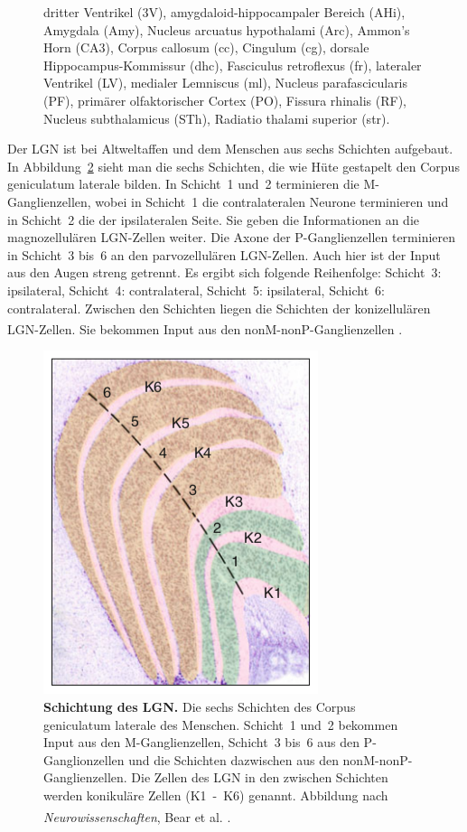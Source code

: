 \documentclass[12pt,a4paper,pdftex]{article}
\begin{document}
\begin{figure}[H]
{    dritter Ventrikel (3V), amygdaloid-hippocampaler Bereich (AHi), Amygdala (Amy), Nucleus arcuatus hypothalami (Arc), Ammon's Horn (CA3), Corpus callosum (cc), Cingulum (cg), dorsale Hippocampus-Kommissur (dhc), Fasciculus retroflexus (fr), lateraler Ventrikel (LV), medialer Lemniscus (ml), Nucleus parafascicularis (PF),  primärer  olfaktorischer  Cortex (PO), Fissura rhinalis (RF), Nucleus subthalamicus (STh), Radiatio thalami superior (str).}
    \label{fig:LGN}
\end{figure}

Der LGN ist bei Altweltaffen und dem Menschen aus sechs Schichten aufgebaut. 
In Abbildung~\ref{fig:schichtung-LGN} sieht man die sechs Schichten, die wie Hüte gestapelt den Corpus geniculatum laterale bilden. In Schicht~1 und~2 terminieren die M-Ganglienzellen, wobei in Schicht~1 die contralateralen Neurone terminieren und in Schicht~2 die der ipsilateralen Seite. Sie geben die Informationen an die magnozellulären LGN-Zellen weiter. Die Axone der P-Ganglienzellen terminieren in Schicht~3 bis~6 an den parvozellulären LGN-Zellen. Auch hier ist der Input aus den Augen streng getrennt. Es ergibt sich folgende Reihenfolge: Schicht~3: ipsilateral, Schicht~4: contralateral, Schicht~5: ipsilateral, Schicht~6: contralateral.
Zwischen den Schichten liegen die Schichten der konizellulären LGN-Zellen. Sie bekommen Input aus den nonM-nonP-Ganglienzellen \textsuperscript{\cite[9.7]{heldmaier2003tierphysiologie}}.

\begin{figure}[H]
    \centering
    \includegraphics{pictures/visual/LGN_baer.png}
    \caption[Schichtung des LGN]{\textbf{Schichtung des LGN.} Die sechs Schichten des Corpus geniculatum laterale des Menschen. Schicht~1 und~2 bekommen Input aus den M-Ganglienzellen, Schicht~3 bis~6 aus den P-Ganglionzellen und die Schichten dazwischen aus den nonM-nonP-Ganglienzellen. Die Zellen des LGN in den zwischen Schichten werden konikuläre Zellen (K1~-~K6) genannt. Abbildung nach \textit{Neurowissenschaften}, Bear et al. \textsuperscript{\cite[10]{neurowissenschaften_baer}}.}
    \label{fig:schichtung-LGN}
\end{figure} 
\end{document}
